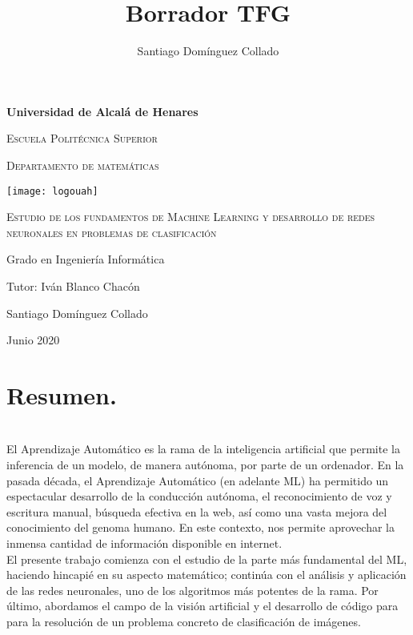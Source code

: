 \documentclass[a4paper,11pt]{article}
\author{Santiago Domínguez Collado}
\title{Borrador TFG}
\begin{document}
\begin{titlepage}
\centering
{\bfseries\LARGE Universidad de Alcalá de Henares \par}
\vspace{0.5cm}
{\scshape\Large Escuela Politécnica Superior \par}
\vspace{0.5cm}
{\scshape\Large Departamento de matemáticas \par}

\vspace{1.5cm}
{\texttt{[image: logouah]}} 


\vspace{1cm}
{\scshape\Large Estudio de los fundamentos de Machine Learning y desarrollo de redes neuronales en problemas de clasificación \par}
\vspace{3cm}

{\Large Grado en Ingeniería Informática \par}
\vspace{0.5cm}
{\Large Tutor: Iván Blanco Chacón\par}
\vspace{0.5cm}
{\Large Santiago Domínguez Collado \par}
\vfill
{\Large Junio 2020 \par}
\end{titlepage}


\tableofcontents

\newpage
\chapter{\textbf{\large Resumen.}}\\


El Aprendizaje Automático es la rama de la inteligencia artificial que permite la inferencia de un modelo, de manera autónoma, por parte de un ordenador. En la pasada década, el Aprendizaje Automático (en adelante ML) ha permitido un espectacular desarrollo de la conducción autónoma, el reconocimiento de voz y escritura manual, búsqueda efectiva en la web, así como una vasta mejora del conocimiento del genoma humano. En este contexto, nos permite aprovechar la inmensa cantidad de información disponible en internet.\\

\noindent
El presente trabajo comienza con el estudio de la parte más fundamental del ML, haciendo hincapié en su aspecto matemático; continúa con el análisis y aplicación de las redes neuronales, uno de los algoritmos más potentes de la rama. Por último, abordamos el campo de la visión artificial y el desarrollo de código para para la resolución de un problema concreto de clasificación de imágenes.\\
\end{document}
